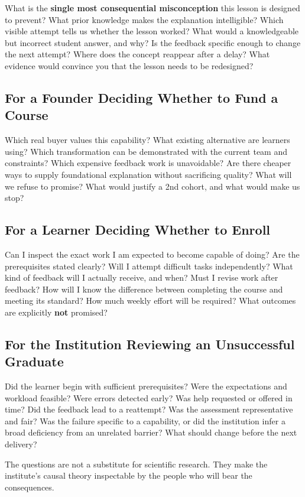 What is the \textbf{single most consequential misconception} this lesson is designed to prevent? What prior knowledge makes the explanation intelligible? Which visible attempt tells us whether the lesson worked? What would a knowledgeable but incorrect student answer, and why? Is the feedback specific enough to change the next attempt? Where does the concept reappear after a delay? What evidence would convince you that the lesson needs to be redesigned?

\subsection*{For a Founder Deciding Whether to Fund a Course}

Which real buyer values this capability? What existing alternative are learners using? Which transformation can be demonstrated with the current team and constraints? Which expensive feedback work is unavoidable? Are there cheaper ways to supply foundational explanation without sacrificing quality? What will we refuse to promise? What would justify a 2nd cohort, and what would make us stop?

\subsection*{For a Learner Deciding Whether to Enroll}

Can I inspect the exact work I am expected to become capable of doing? Are the prerequisites stated clearly? Will I attempt difficult tasks independently? What kind of feedback will I actually receive, and when? Must I revise work after feedback? How will I know the difference between completing the course and meeting its standard? How much weekly effort will be required? What outcomes are explicitly \textbf{not} promised?

\subsection*{For the Institution Reviewing an Unsuccessful Graduate}

Did the learner begin with sufficient prerequisites? Were the expectations and workload feasible? Were errors detected early? Was help requested or offered in time? Did the feedback lead to a reattempt? Was the assessment representative and fair? Was the failure specific to a capability, or did the institution infer a broad deficiency from an unrelated barrier? What should change before the next delivery?

The questions are not a substitute for scientific research. They make the institute's causal theory inspectable by the people who will bear the consequences.
